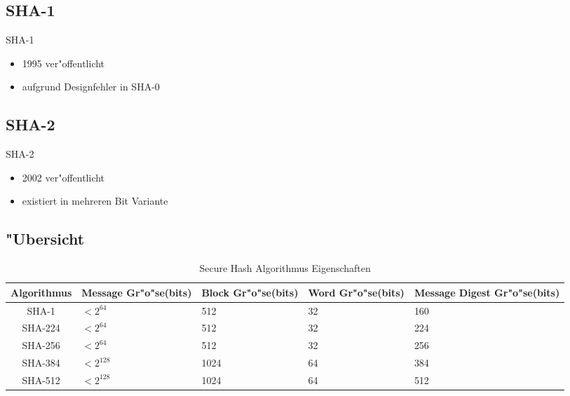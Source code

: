 \documentclass[xcolor=x11names,compress]{beamer}
\renewcommand{\(}{\begin{columns}}
\renewcommand{\)}{\end{columns}}
\newcommand{\<}[1]{\begin{column}{#1}}
\renewcommand{\>}{\end{column}}
\begin{document}
\subsection{SHA-1}
\begin{frame}{SHA-1}
\begin{itemize}
\item 1995 ver"offentlicht
\pause
\item aufgrund Designfehler in SHA-0
\end{itemize}
\end{frame}


\subsection{SHA-2}
\begin{frame}{SHA-2}
\begin{itemize}
\item 2002 ver"offentlicht
\pause
\item existiert in mehreren Bit Variante



\end{itemize}
\end{frame}

\subsection{"Ubersicht}
\begin{frame}[shrink=30]{}
\begin{table}[c]
\caption{Secure Hash Algorithmus Eigenschaften}
\begin{tabular}[ht]{|c|p{}|p{}|p{}|p{}|}
  \hline
  Algorithmus &  Message Gr"o"se(bits) & Block Gr"o"se(bits) & Word Gr"o"se(bits) & Message Digest Gr"o"se(bits)\\
  \hline\hline
  SHA-1   & $<2^{64}$  &  512 & 32 & 160\\
  SHA-224 & $<2^{64}$  &  512 & 32 & 224\\
  SHA-256 & $<2^{64}$  &  512 & 32 & 256\\
  SHA-384 & $<2^{128}$ & 1024 & 64 & 384\\  
  SHA-512 & $<2^{128}$ & 1024 & 64 & 512\\  
  \hline
\end{tabular}
\label{tab:meinetabelle}
\end{table}
\end{frame}
\end{document}
